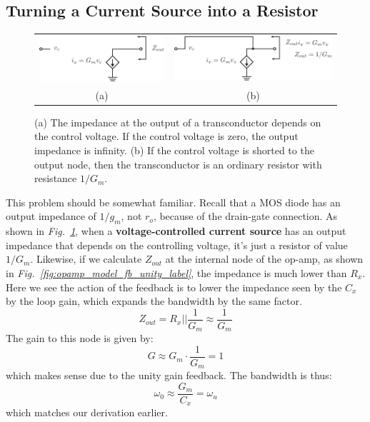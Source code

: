 \subsection{Turning a Current Source into a Resistor}
\begin{figure}[tb]
\centering
\begin{tabular}{cc}
\includegraphics[width=.4\columnwidth]{tia_zout} &
\includegraphics[width=.4\columnwidth]{tia_zout_fb}\\
(a) & (b)\\
\end{tabular}
\caption{(a) The impedance at the output of a transconductor depends on the control voltage. If the control voltage is zero, the output impedance is infinity.  (b) If the control voltage is shorted to the output node, then the transconductor is an ordinary resistor with resistance $1/G_m$.}
\label{fig:tia_zout}
\end{figure}
This problem should be somewhat familiar.  Recall that a MOS diode has an output impedance of $1/g_m$, not $r_o$, because of the drain-gate connection.  As shown in \emph{Fig.~\ref{fig:tia_zout}}, when a \textbf{voltage-controlled current source} has an output impedance that depends on the controlling voltage, it's just a resistor of value $1/G_m$.  Likewise, if we calculate $Z_{out}$ at the internal node of the op-amp, as shown in \emph{Fig.~\ref{fig:opamp_model_fb_unity_label}}, the impedance is much lower than $R_x$.   Here we see the action of the feedback is to lower the impedance seen by the $C_x$ by the loop gain, which expands the bandwidth by the same factor.
    \begin{equation}
        Z_{out} = R_x || \frac{1}{G_m} \approx \frac{1}{G_m}
    \end{equation}
The gain to this node is given by:
    \begin{equation}
        G \approx G_m \cdot \frac{1}{G_m} = 1
    \end{equation}
which makes sense due to the unity gain feedback.  The bandwidth is thus:
    \begin{equation}
        \omega_0 \approx \frac{G_m}{C_x } = \omega_u
    \end{equation}
which matches our derivation earlier.

